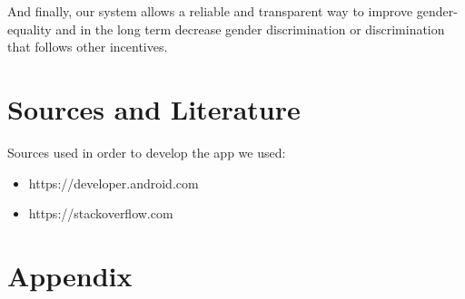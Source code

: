 \documentclass[portrait,a4paper]{article}
\begin{document}
		And finally, our system allows a reliable and transparent way to improve gender-equality and in the long term
		decrease gender discrimination or discrimination that follows other incentives.
		
\section{Sources and Literature}
	Sources used in order to develop the app we used:
	\begin{itemize}
		\item https://developer.android.com
		\item https://stackoverflow.com
	\end{itemize}
	

\clearpage


\section{Appendix}
	
\end{document}

